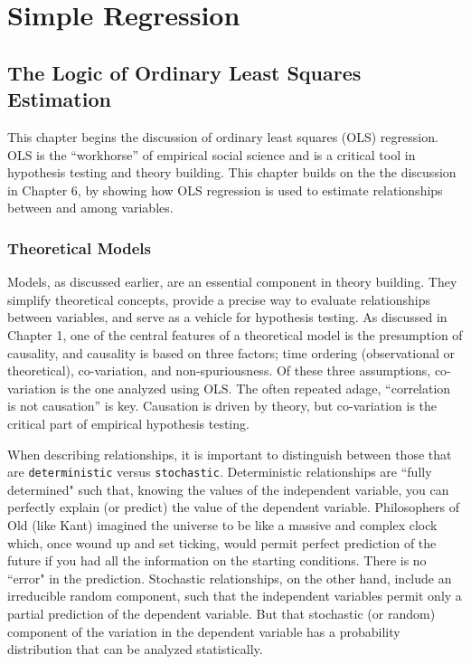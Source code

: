\documentclass[11pt,openany]{book}\usepackage[]{graphicx}\usepackage[]{color}
\begin{document}
\part{Simple Regression} 





\chapter{The Logic of Ordinary Least Squares Estimation}

This chapter begins the discussion of ordinary least squares (OLS) regression. OLS is the ``workhorse'' of empirical social science and is a critical tool in hypothesis testing and theory building. This chapter builds on the the discussion in Chapter 6, by showing how OLS regression is used to estimate relationships between and among variables. 

\section{Theoretical Models}

Models, as discussed earlier, are an essential component in theory building. They simplify theoretical concepts, provide a precise way to evaluate relationships between variables, and serve as a vehicle for hypothesis testing. As discussed in Chapter 1, one of the central features of a theoretical model is the presumption of causality, and causality is based on three factors; time ordering (observational or theoretical), co-variation, and non-spuriousness. Of these three assumptions, co-variation is the one analyzed using OLS. The often repeated adage, ``correlation is not causation'' is key. Causation is driven by theory, but co-variation is the critical part of empirical hypothesis testing. 

When describing relationships, it is important to distinguish between those that are \texttt{deterministic} versus \texttt{stochastic}. Deterministic relationships are ``fully determined" such that, knowing the values of the independent variable, you can perfectly explain (or predict) the value of the dependent variable. Philosophers of Old (like Kant) imagined the universe to be like a massive and complex clock which, once wound up and set ticking, would permit perfect prediction of the future if you had all the information on the starting conditions. There is no ``error" in the prediction. Stochastic relationships, on the other hand, include an irreducible random component, such that the independent variables permit only a partial prediction of the dependent variable. But that stochastic (or random) component of the variation in the dependent variable has a probability distribution that can be analyzed statistically. 
\end{document}
